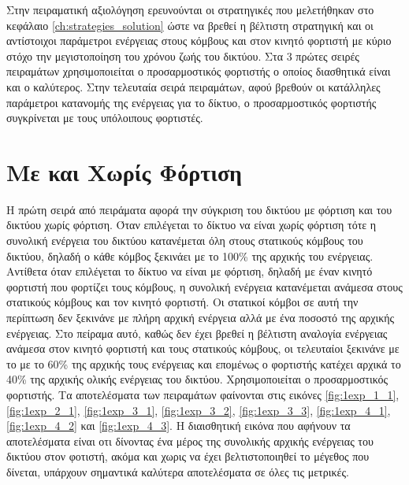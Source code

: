 Στην πειραματική αξιολόγηση ερευνούνται οι στρατηγικές που μελετήθηκαν στο κεφάλαιο \ref{ch:strategies_solution} ώστε να βρεθεί η βέλτιστη στρατηγική και οι
αντίστοιχοι παράμετροι ενέργειας στους κόμβους και στον κινητό φορτιστή με κύριο στόχο την μεγιστοποίηση του χρόνου ζωής του δικτύου. Στα 3 πρώτες σειρές πειραμάτων
χρησιμοποιείται ο προσαρμοστικός φορτιστής ο οποίος διασθητικά είναι και ο καλύτερος. Στην τελευταία σειρά πειραμάτων, αφού βρεθούν οι κατάλληλες παράμετροι
κατανομής της ενέργειας για το δίκτυο, ο προσαρμοστικός φορτιστής συγκρίνεται με τους υπόλοιπους φορτιστές.

\section{Με και Χωρίς Φόρτιση}\label{sc:result1}
Η πρώτη σειρά από πειράματα αφορά την σύγκριση του δικτύου με φόρτιση και του δικτύου χωρίς φόρτιση. Όταν επιλέγεται το δίκτυο να είναι χωρίς φόρτιση τότε η συνολική
ενέργεια του δικτύου κατανέμεται όλη στους στατικούς κόμβους του δικτύου, δηλαδή ο κάθε κόμβος ξεκινάει με το 100\% της αρχικής του ενέργειας. Αντίθετα όταν
επιλέγεται το δίκτυο να είναι με φόρτιση, δηλαδή με έναν κινητό φορτιστή που φορτίζει τους κόμβους, η συνολική ενέργεια κατανέμεται ανάμεσα στους στατικούς κόμβους
και τον κινητό φορτιστή. Οι στατικοί κόμβοι σε αυτή την περίπτωση δεν ξεκινάνε με πλήρη αρχική ενέργεια αλλά με ένα ποσοστό της αρχικής ενέργειας. Στο πείραμα αυτό,
καθώς δεν έχει βρεθεί η βέλτιστη αναλογία ενέργειας ανάμεσα στον κινητό φορτιστή και τους στατικούς κόμβους, οι τελευταίοι ξεκινάνε με το με το 60\% της αρχικής τους
ενέργειας και επομένως ο φορτιστής κατέχει αρχικά το 40\% της αρχικής ολικής ενέργειας του δικτύου. Χρησιμοποιείται ο προσαρμοστικός φορτιστής. Τα αποτελέσματα των
πειραμάτων φαίνονται στις εικόνες \ref{fig:1exp_1_1}, \ref{fig:1exp_2_1}, \ref{fig:1exp_3_1}, \ref{fig:1exp_3_2}, \ref{fig:1exp_3_3}, \ref{fig:1exp_4_1},
\ref{fig:1exp_4_2} και \ref{fig:1exp_4_3}. Η διαισθητική εικόνα που αφήνουν τα αποτελέσματα είναι οτι δίνοντας ένα μέρος της συνολικής αρχικής ενέργειας του δικτύου
στον φοτιστή, ακόμα και χωρις να έχει βελτιστοποιηθεί το μέγεθος που δίνεται, υπάρχουν σημαντικά καλύτερα αποτελέσματα σε όλες τις μετρικές.



